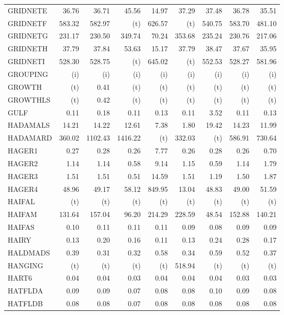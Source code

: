 \documentclass[11pt,twoside]{article}
\begin{document}
{\begin{longtable}[c]{|l|r|r|r|r|r|r|r|r|}
GRIDNETE & 36.76 & 36.71 & 45.56 & 14.97 & 37.29 & 37.48 & 36.78 & 35.51 \\
GRIDNETF & 583.32 & 582.97 & (t) & 626.57 & (t) & 540.75 & 583.70 & 481.10 \\
GRIDNETG & 231.17 & 230.50 & 349.74 & 70.24 & 353.68 & 235.24 & 230.76 & 217.06 \\
GRIDNETH & 37.79 & 37.84 & 53.63 & 15.17 & 37.79 & 38.47 & 37.67 & 35.95 \\
GRIDNETI & 528.30 & 528.75 & (t) & 645.02 & (t) & 552.53 & 528.27 & 581.96 \\
GROUPING & (i) & (i) & (i) & (i) & (i) & (i) & (i) & (i) \\
GROWTH & (t) & 0.41 & (t) & (t) & (t) & (t) & (t) & (t) \\
GROWTHLS & (t) & 0.42 & (t) & (t) & (t) & (t) & (t) & (t) \\
GULF & 0.11 & 0.18 & 0.11 & 0.13 & 0.11 & 3.52 & 0.11 & 0.13 \\
HADAMALS & 14.21 & 14.22 & 12.61 & 7.38 & 1.80 & 19.42 & 14.23 & 11.99 \\
HADAMARD & 360.02 & 1102.43 & 1416.22 & (t) & 332.03 & (t) & 586.91 & 730.64 \\
HAGER1 & 0.27 & 0.28 & 0.26 & 7.77 & 0.26 & 0.28 & 0.26 & 0.70 \\
HAGER2 & 1.14 & 1.14 & 0.58 & 9.14 & 1.15 & 0.59 & 1.14 & 1.79 \\
HAGER3 & 1.51 & 1.51 & 0.51 & 14.59 & 1.51 & 1.19 & 1.50 & 1.87 \\
HAGER4 & 48.96 & 49.17 & 58.12 & 849.95 & 13.04 & 48.83 & 49.00 & 51.59 \\
HAIFAL & (t) & (t) & (t) & (t) & (t) & (t) & (t) & (t) \\
HAIFAM & 131.64 & 157.04 & 96.20 & 214.29 & 228.59 & 48.54 & 152.88 & 140.21 \\
HAIFAS & 0.10 & 0.11 & 0.11 & 0.11 & 0.09 & 0.08 & 0.09 & 0.09 \\
HAIRY & 0.13 & 0.20 & 0.16 & 0.11 & 0.13 & 0.24 & 0.28 & 0.17 \\
HALDMADS & 0.39 & 0.31 & 0.32 & 0.58 & 0.34 & 0.59 & 0.52 & 0.37 \\
HANGING & (t) & (t) & (t) & (t) & 518.94 & (t) & (t) & (t) \\
HART6 & 0.04 & 0.04 & 0.03 & 0.04 & 0.04 & 0.04 & 0.03 & 0.03 \\
HATFLDA & 0.09 & 0.09 & 0.07 & 0.08 & 0.08 & 0.10 & 0.09 & 0.08 \\
HATFLDB & 0.08 & 0.08 & 0.07 & 0.08 & 0.08 & 0.08 & 0.08 & 0.08 \\

\end{longtable}}
\end{document}
